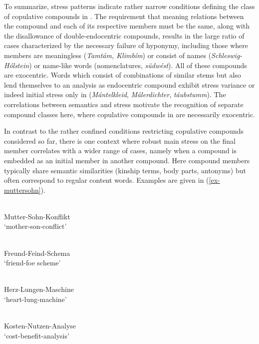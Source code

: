 \documentclass[output=paper
 ,nobabel
 ,draftmode
 ,colorlinks, citecolor=brown
]{langscibook}
\begin{document}
\noindent
To summarize, stress patterns indicate rather narrow conditions defining the class of copulative
compounds in . The requirement that meaning relations between the compound and each of its
respective members must be the same, along with the disallowance of double-endocentric compounds,
results in the large ratio of cases characterized by the necessary failure of hyponymy, including
those where members are meaningless (\emph{Tamtám, Klimbím}) or consist of names
(\emph{Schleswig-Hólstein}) or name-like words (nomenclatures, \eg \emph{südwést}). All of these
compounds are exocentric. Words which consist of combinations of similar stems but also lend
themselves to an analysis as endocentric compound exhibit stress variance or indeed initial stress
only in  (\eg \emph{Mántelkleid}, \emph{Málerdichter}, \emph{táubstumm}). The correlations
between semantics and stress motivate the recognition of separate compound classes here, where
copulative compounds in  are necessarily exocentric. 
 
 In contrast to the rather confined conditions restricting copulative compounds considered so far,
 there is one context where robust main stress on the final member correlates with a wider range of
 cases, namely when a compound is embedded as an initial member in another compound. Here compound
 members typically share semantic similarities (\eg kinship terms, body parts, antonyms) but often
 correspond to regular content words. Examples are given in (\ref{ex-muttersohn}).  
 


\eal\label{ex-muttersohn}
\\
Mutter-Sohn-Konflikt\\
`mother-son-conflict'

\\
Freund-Feind-Schema\\
`friend-foe scheme'

\\
Herz-Lungen-Maschine\\
`heart-lung-machine'

\\
Kosten-Nutzen-Analyse\\
`cost-benefit-analysis'
\end{document}

